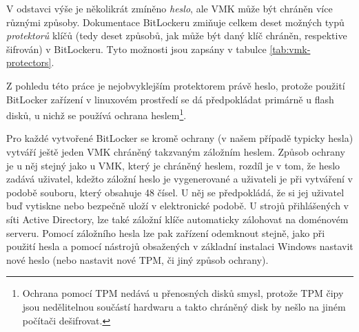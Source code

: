 V odstavci výše je několikrát zmíněno \emph{heslo}, ale VMK může být chráněn více různými způsoby. Dokumentace BitLockeru \cite{Zxwr6wjYZUQ6z8Yo} zmiňuje celkem deset možných typů \emph{protektorů} klíčů (tedy deset způsobů, jak může být daný klíč chráněn, respektive šifrován) v BitLockeru. Tyto možnosti jsou zapsány v tabulce \ref{tab:vmk-protectors}.


Z pohledu této práce je nejobvyklejším protektorem právě heslo, protože použití BitLocker zařízení v linuxovém prostředí se dá předpokládat primárně u flash disků, u nichž se používá ochrana heslem\footnote{Ochrana pomocí TPM nedává u přenosných disků smysl, protože TPM čipy jsou nedělitelnou součástí hardwaru a takto chráněný disk by nešlo na jiném počítači dešifrovat.}.

Pro každé vytvořené BitLocker se kromě  ochrany (v našem případě typicky hesla) vytváří ještě jeden VMK chráněný takzvaným záložním heslem. Způsob ochrany je u něj stejný jako u VMK, který je chráněný heslem, rozdíl je v tom, že heslo zadává uživatel, kdežto záložní heslo je vygenerované a uživateli je při vytváření  v podobě souboru, který obsahuje 48 čísel. U něj se předpokládá, že si jej uživatel buď vytiskne nebo bezpečně uloží v elektronické podobě. U strojů přihlášených v síti Active Directory, lze také záložní klíče automaticky zálohovat na doménovém serveru. Pomocí záložního hesla lze pak zařízení odemknout stejně, jako při použití  hesla a pomocí nástrojů obsažených v základní instalaci Windows nastavit nové heslo (nebo nastavit nové TPM, či jiný způsob ochrany).\cite{Hall2019}

